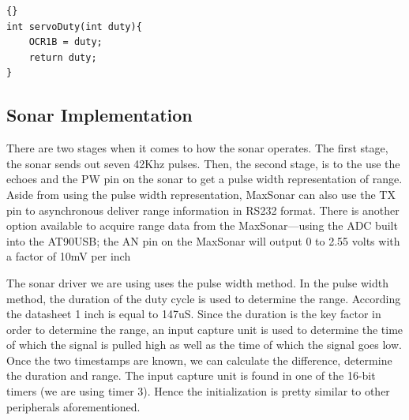 \lstset{language=c}
\lstset{commentstyle=\textit}
\begin{lstlisting}[frame=trbl]{}
int servoDuty(int duty){
	OCR1B = duty;
	return duty;
}
\end{lstlisting}

\subsection{Sonar Implementation}
There are two stages when it comes to how the sonar operates. The first stage, the sonar sends out seven 42Khz pulses. Then, the second stage, is to the use the echoes and the PW pin on the sonar to get a pulse width representation of range. Aside from using the pulse width representation, MaxSonar can also use the TX pin to asynchronous deliver range information in RS232 format. There is another option available to acquire range data from the MaxSonar---using the ADC built into the AT90USB; the AN pin on the MaxSonar will output 0 to 2.55 volts with a factor of 10mV per inch

The sonar driver we are using uses the pulse width method. In the pulse width method, the duration of the duty cycle is used to determine the range. According the datasheet 1 inch is equal to 147uS. Since the duration is the key factor in order to determine the range, an input capture unit is used to determine the time of which the signal is pulled high as well as the time of which the signal goes low. Once the two timestamps are known, we can calculate the difference, determine the duration and range. The input capture unit is found in one of the 16-bit timers (we are using timer 3). Hence the initialization is pretty similar to other peripherals aforementioned.

